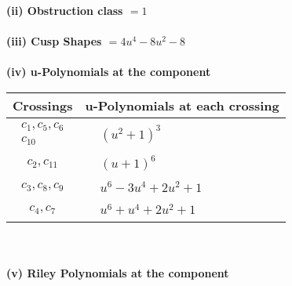 \documentclass[1p]{elsarticle_modified}
\theoremstyle{definition}
\begin{document}
\flushleft \textbf{(ii) Obstruction class $= 1$}\\~\\
\flushleft \textbf{(iii) Cusp Shapes $= 4 u^4-8 u^2-8$}\\~\\
\newpage\renewcommand{\arraystretch}{1}
\flushleft \textbf{(iv) u-Polynomials at the component}\newline \\
\begin{tabular}{m{50pt}|m{274pt}}
Crossings & \hspace{64pt}u-Polynomials at each crossing \\
\hline $$\begin{aligned}c_{1},c_{5},c_{6}\\c_{10}\end{aligned}$$&$\begin{aligned}
&(u^2+1)^3
\end{aligned}$\\
\hline $$\begin{aligned}c_{2},c_{11}\end{aligned}$$&$\begin{aligned}
&(u+1)^6
\end{aligned}$\\
\hline $$\begin{aligned}c_{3},c_{8},c_{9}\end{aligned}$$&$\begin{aligned}
&u^6-3 u^4+2 u^2+1
\end{aligned}$\\
\hline $$\begin{aligned}c_{4},c_{7}\end{aligned}$$&$\begin{aligned}
&u^6+u^4+2 u^2+1
\end{aligned}$\\
\hline
\end{tabular}\\~\\
\newpage\renewcommand{\arraystretch}{1}
\flushleft \textbf{(v) Riley Polynomials at the component}\newline \\
\end{document}
